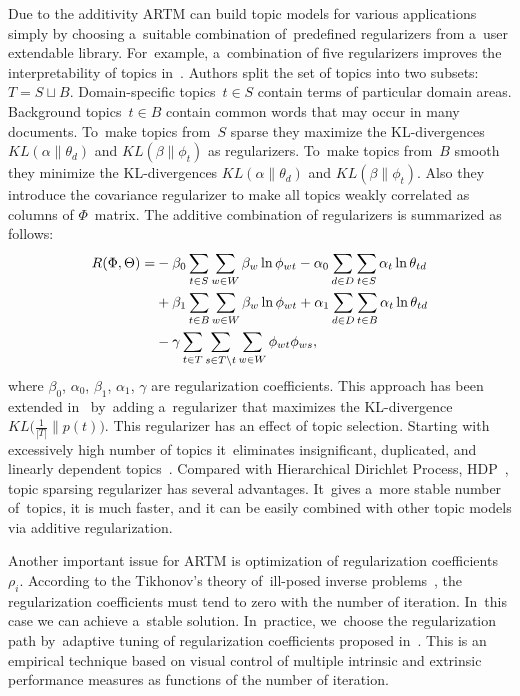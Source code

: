 \documentclass{acm_proc_article-sp}
\begin{document}
Due to the additivity ARTM can build topic models for various applications
simply by choosing a~suitable combination of~predefined regularizers
from a~user extendable \mbox{library}.
%
For~example, 
a~combination of five regularizers improves the interpretability of topics in~\cite{voron14mlj}.
Authors split the set of topics into two subsets: ${T = S \sqcup B}$. 
Domain-specific topics~${t\in S}$ contain terms of particular domain areas.
Background topics~${t\in B}$ contain common words that may occur in many documents.
To~make topics from~$S$ sparse they maximize the KL-divergences
$KL(\alpha\|\theta_d)$ and
$KL(\beta\|\phi_t)$ as regularizers.
To~make topics from~$B$ smooth they minimize the KL-divergences
$KL(\alpha\|\theta_d)$ and
$KL(\beta\|\phi_t)$.
Also they introduce the covariance regularizer
to make all topics weakly correlated as columns of $\Phi$~matrix.
The additive combination of regularizers is summarized as follows:
\begin{align*}
    R(\Phi,\Theta)
    =&
    - \beta_0 \sum_{t\in S} \sum_{w\in W} \beta_w \ln \phi_{wt}
    - \alpha_0 \sum_{d\in D} \sum_{t\in S} \alpha_t \ln \theta_{td}
    \notag
\\  {}&
    + \beta_1 \sum_{t\in B} \sum_{w\in W} \beta_w \ln \phi_{wt}
    + \alpha_1 \sum_{d\in D} \sum_{t\in B} \alpha_t \ln \theta_{td}
\\  {}&
    - \gamma
        \sum_{t\in T}
        \sum_{s\in T\backslash t}
        \sum_{w\in W} \phi_{wt}\phi_{ws},
\end{align*}
where $\beta_0$, $\alpha_0$, $\beta_1$, $\alpha_1$, $\gamma$
are regularization coefficients.
This approach has been extended in~\cite{voron14aist} by~adding 
a~regularizer that maximizes the KL-divergence
$KL\bigl( \frac1{|T|}\|p(t) \bigr)$.
This regularizer has an effect of topic selection.
Starting with excessively high number of topics
it~eliminates insignificant, duplicated, and linearly dependent topics~\cite{voron15slds}.
Compared with Hierarchical Dirichlet Process, HDP~\cite{teh06hierarchical},
topic sparsing regularizer has several advantages.
It~gives a~more stable number of~topics, it is much faster, 
and it can be easily combined with other topic models via additive regularization.

Another important issue for ARTM is optimization of regularization coefficients~$\rho_i$.
According to the Tikhonov's theory of~ill-posed inverse problems~\cite{tihonov77methods-eng},
the regularization coefficients must tend to zero with the number of iteration. 
In~this case we can achieve a~stable solution.
In~practice, 
we~choose the regularization path 
by~adaptive tuning of regularization coefficients proposed in~\cite{voron14mlj,voron14aist,voron15slds}.
This is an empirical technique based on visual control of 
multiple intrinsic and extrinsic performance measures
as functions of the number of iteration.
\end{document}
